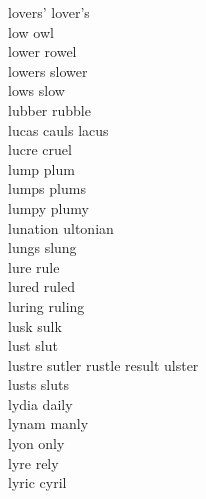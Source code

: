 lovers' lover's\\
low owl\\
lower rowel\\
lowers slower\\
lows slow\\
lubber rubble\\
lucas cauls lacus\\
lucre cruel\\
lump plum\\
lumps plums\\
lumpy plumy\\
lunation ultonian\\
lungs slung\\
lure rule\\
lured ruled\\
luring ruling\\
lusk sulk\\
lust slut\\
lustre sutler rustle result ulster\\
lusts sluts\\
lydia daily\\
lynam manly\\
lyon only\\
lyre rely\\
lyric cyril\\

